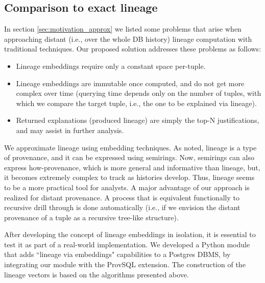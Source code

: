 \subsection{Comparison to exact lineage} In section \ref{sec:motivation_approx} we listed some problems that arise when approaching distant (i.e., over the whole DB history) lineage computation with traditional techniques. Our proposed solution addresses these problems as follows:
\begin{itemize}
    \item Lineage embeddings require only a constant space per-tuple.
    \item Lineage embeddings are immutable once computed, and do not get more complex over time (querying time depends only on the number of tuples, with which we compare the target tuple, i.e., the one to be explained via lineage).
    \item Returned explanations (produced lineage) are simply the top-N justifications, and may assist in further analysis.
\end{itemize}
We approximate lineage using embedding techniques. As noted, lineage is a type of provenance, and it can be expressed using semirings. Now, semirings can also express how-provenance, which is more general and informative than lineage, but, it becomes extremely complex to track as histories develop. Thus, lineage seems to be a more practical tool for analysts.
A major advantage of our approach is realized for distant provenance. A process that is equivalent functionally to recursive drill through is done automatically (i.e., if we envision the distant provenance of a tuple as a recursive tree-like structure).\\

\par After developing the concept of lineage embeddings in isolation, it is essential to test it as part of a real-world implementation. We developed a Python module that adds ``lineage via embeddings" capabilities to a Postgres DBMS, by integrating our module with the ProvSQL \cite{Senellart2018} extension. The construction of the lineage vectors is based on the algorithms presented above.


